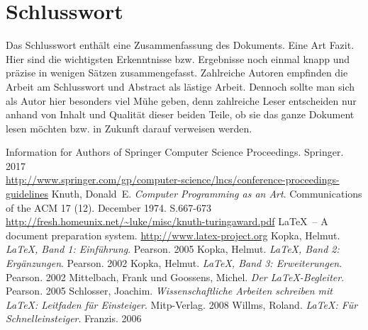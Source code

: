 \documentclass{llncs}
\begin{document}
\section{Schlusswort}

Das Schlusswort enthält eine Zusammenfassung des Dokuments. Eine Art Fazit. Hier sind die wichtigsten Erkenntnisse bzw. Ergebnisse noch einmal knapp und präzise in wenigen Sätzen zusammengefasst. Zahlreiche Autoren empfinden die Arbeit am Schlusswort und Abstract als lästige Arbeit. Dennoch sollte man sich als Autor hier besonders viel Mühe geben, denn zahlreiche Leser entscheiden nur anhand von Inhalt und Qualität dieser beiden Teile, ob sie das ganze Dokument lesen möchten bzw. in Zukunft darauf verweisen werden.



\begin{thebibliography}{5}

Information for Authors of Springer Computer Science Proceedings. Springer. 2017\\
\url{http://www.springer.com/gp/computer-science/lncs/conference-proceedings-guidelines}
Knuth, Donald~E. \textsl{Computer Programming as an Art}. Communications of the ACM 17 (12). December 1974. S.667-673\\
\url{http://fresh.homeunix.net/~luke/misc/knuth-turingaward.pdf}
\LaTeX\ -- A document preparation system.
\url{http://www.latex-project.org}
Kopka, Helmut. \textsl{\LaTeX, Band 1: Einführung}. Pearson. 2005
Kopka, Helmut. \textsl{\LaTeX, Band 2: Ergänzungen}. Pearson. 2002
Kopka, Helmut. \textsl{\LaTeX, Band 3: Erweiterungen}. Pearson. 2002
Mittelbach, Frank und Goossens, Michel. \textsl{Der LaTeX-Begleiter}. Pearson. 2005
Schlosser, Joachim. \textsl{Wissenschaftliche Arbeiten schreiben mit LaTeX: Leitfaden für Einsteiger}. Mitp-Verlag. 2008
Willms, Roland. \textsl{\LaTeX: Für Schnelleinsteiger}. Franzis. 2006
\end{thebibliography}
\end{document}
